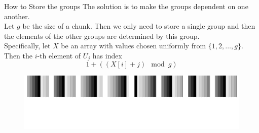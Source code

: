 \documentclass[xcolor=x11names, svgnames, rgb]{beamer}
\begin{document}
\begin{frame}[t]{How to Store the groups}
	The solution is to make the groups dependent on one another.\\
	Let $g$ be the size of a chunk.
	Then we only need to store a single group and then the elements of the other groups are determined by this group.\\
	Specifically, let $X$ be an array with values chosen uniformly from $\{1,2,\ldots,g\}$. Then the $i$-th element of $U_j$ has index 
	$$ 1 + ((X[i]+j)\mod g)$$
	\begin{figure}
		\includegraphics[width=\linewidth]{imgs/blackrainbow.png}
	\end{figure}	
\end{frame}
\end{document}
